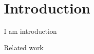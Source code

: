 \section{Introduction}
\label{sec:introduction}
I am introduction


\smallskip

\noindent Related work



